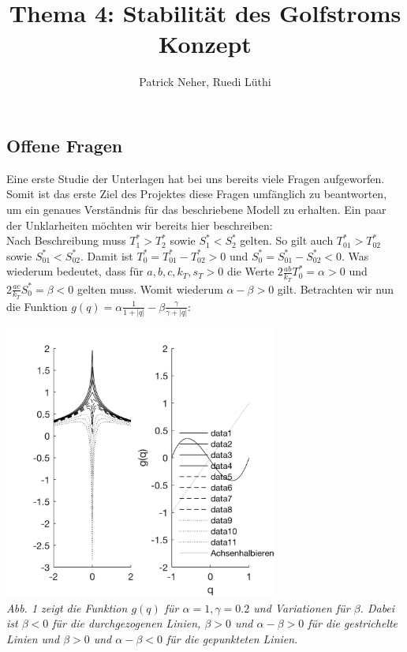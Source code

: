 \documentclass[10pt,a4paper]{article}
\author{Patrick Neher, Ruedi Lüthi}
\title{Thema 4: Stabilität des Golfstroms \\ \textbf{Konzept} }
\begin{document}
	\maketitle

	\subsection*{Offene Fragen}

	Eine erste Studie der Unterlagen hat bei uns bereits viele Fragen aufgeworfen. Somit ist das erste Ziel des Projektes diese Fragen umfänglich zu beantworten, um ein genaues Verständnis für das beschriebene Modell zu erhalten. Ein paar der Unklarheiten möchten wir bereits hier beschreiben:\\
	
	Nach Beschreibung muss \(T^*_1 > T^*_2\) sowie \(S^*_1 < S^*_2\) gelten. So gilt auch \(T^*_{01} > T^*_{02}\) sowie \(S^*_{01} < S^*_{02}\). Damit ist \(T^*_0 = T^*_{01} - T^*_{02} > 0\) und \(S^*_0 = S^*_{01} - S^*_{02} < 0\). Was wiederum bedeutet, dass für \(a, b, c, k_T, s_T > 0\) die Werte \(2\frac{ab}{k_T}T^*_0 = \alpha > 0\) und  \(2\frac{ac}{k_T}S^*_0 = \beta < 0\) gelten muss. Womit wiederum \(\alpha - \beta > 0\) gilt. Betrachten wir nun die Funktion \(g(q) = \alpha \frac{1}{1+|q|} - \beta \frac{\gamma}{\gamma + |q|} \):

	\begin{center}
	\includegraphics[width=9cm]{Grafik/g_von_q.png} \\
	\textit{Abb. 1 zeigt die Funktion \(g(q)\) für \(\alpha = 1, \gamma = 0.2\) und Variationen für \(\beta\). Dabei ist \(\beta < 0\) für die durchgezogenen Linien, \(\beta > 0\) und \(\alpha - \beta > 0\) für die gestrichelte Linien und \(\beta > 0\) und \(\alpha - \beta < 0\) für die gepunkteten Linien.}
	\end{center}
	
\end{document}

